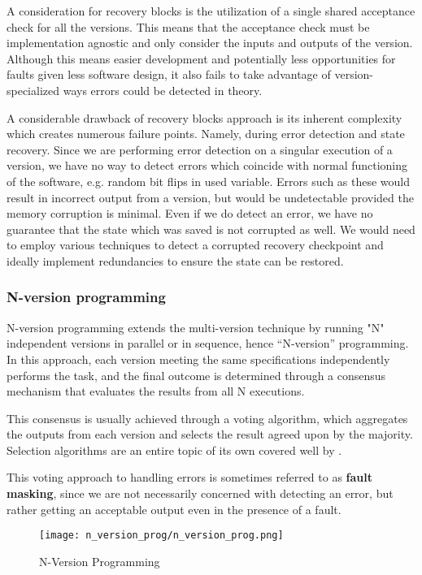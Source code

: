 A consideration for recovery blocks is the utilization of a single shared acceptance check for all the versions. This means that the acceptance check must be implementation agnostic and only consider the inputs and outputs of the version. Although this means easier development and potentially less opportunities for faults given less software design, it also fails to take advantage of version-specialized ways errors could be detected in theory.

A considerable drawback of recovery blocks approach is its inherent complexity which creates numerous failure points. Namely, during error detection and state recovery. Since we are performing error detection on a singular execution of a version, we have no way to detect errors which coincide with normal functioning of the software, e.g. random bit flips in used variable. Errors such as these would result in incorrect output from a version, but would be undetectable provided the memory corruption is minimal. Even if we do detect an error, we have no guarantee that the state which was saved is not corrupted as well. We would need to employ various techniques to detect a corrupted recovery checkpoint and ideally implement redundancies to ensure the state can be restored.

\subsubsection{N-version programming}

N-version programming extends the multi-version technique by running "N" independent versions in parallel or in sequence, hence “N-version” programming. In this approach, each version meeting the same specifications independently performs the task, and the final outcome is determined through a consensus mechanism that evaluates the results from all N executions.

This consensus is usually achieved through a voting algorithm, which aggregates the outputs from each version and selects the result agreed upon by the majority. Selection algorithms are an entire topic of its own covered well by \cite{Aljarbouh_2021}.

This voting approach to handling errors is sometimes referred to as \textbf{fault masking}, since we are not necessarily concerned with detecting an error, but rather getting an acceptable output even in the presence of a fault.

\begin{figure}[hbt!]
    \centering
    \texttt{[image: n\_version\_prog/n\_version\_prog.png]}
    \caption{N-Version Programming}
\end{figure}


